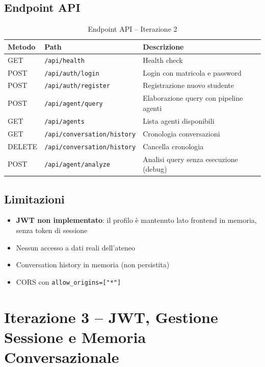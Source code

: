 \documentclass[a4paper,12pt]{report}
\begin{document}
\section{Endpoint API}

\begin{table}[H]
\centering
\small
\begin{tabularx}{\textwidth}{l l X}
\toprule
\textbf{Metodo} & \textbf{Path} & \textbf{Descrizione} \\
\midrule
GET & \texttt{/api/health} & Health check \\
POST & \texttt{/api/auth/login} & Login con matricola e password \\
POST & \texttt{/api/auth/register} & Registrazione nuovo studente \\
POST & \texttt{/api/agent/query} & Elaborazione query con pipeline agenti \\
GET & \texttt{/api/agents} & Lista agenti disponibili \\
GET & \texttt{/api/conversation/history} & Cronologia conversazioni \\
DELETE & \texttt{/api/conversation/history} & Cancella cronologia \\
POST & \texttt{/api/agent/analyze} & Analisi query senza esecuzione (debug) \\
\bottomrule
\end{tabularx}
\caption{Endpoint API -- Iterazione 2}
\end{table}

\section{Limitazioni}

\begin{itemize}
    \item \textbf{JWT non implementato}: il profilo è mantenuto lato frontend in memoria, senza token di sessione
    \item Nessun accesso a dati reali dell'ateneo
    \item Conversation history in memoria (non persistita)
    \item CORS con \texttt{allow\_origins=["*"]}
\end{itemize}


\chapter{Iterazione 3 -- JWT, Gestione Sessione e Memoria Conversazionale}
\end{document}
